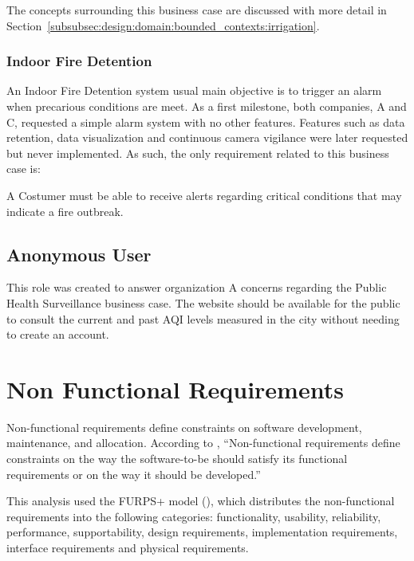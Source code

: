 The concepts surrounding this business case are discussed with more detail in Section~\ref{subsubsec:design:domain:bounded_contexts:irrigation}.

\subsubsection{Indoor Fire Detention}
\label{subsubsec:requirements:functional:costumer:fire}

An Indoor Fire Detention system usual main objective is to trigger an alarm when precarious conditions are meet. As a first milestone, both companies, A and C, requested a simple alarm system with no other features. Features such as data retention, data visualization and continuous camera vigilance were later requested but never implemented. As such, the only requirement related to this business case is:

A Costumer must be able to receive alerts regarding critical conditions that may indicate a fire outbreak.

\subsection{Anonymous User}
\label{subsec:requirements:functional:anonymous}

This role was created to answer organization A concerns regarding the Public Health Surveillance business case. The website should be available for the public to consult the current and past \gls{AQI} levels measured in the city without needing to create an account.

\section{Non Functional Requirements}
\label{sec:requirements:non_functional}

Non-functional requirements define constraints on software development, maintenance, and allocation.
According to \cite{van2009requirements}, “Non-functional requirements define constraints on the way the software-to-be
should satisfy its functional requirements or on the way it should be developed.”

This analysis used the FURPS+ model (\cite{eeles2005capturing}), which distributes the non-functional requirements into the following categories: functionality, usability, reliability, performance, supportability, design requirements, implementation requirements, interface requirements and physical requirements.


